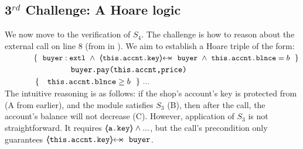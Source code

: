   
  \subsection{3$^{rd}$ Challenge:  A Hoare logic} %
 \label{sec:howThird}


 
 \vspace{.1cm}
 
We now move to the  verification of $S_4$. 
The challenge is how to reason  about the external call on line 8 (from  in ). %
% 
%
% 
We aim to establish a Hoare triple of the form:
 \\
$\strut \ \ \ \ \ \ \ \ \ \ \  \{\  \ { \external{\prg{buyer}}} \ \wedge\ {\protectedFrom {\prg{this.\myAccount.key}} {\prg{buyer}}\ \wedge\ {\prg{this.\myAccount.\balance}}= b    }\ \  \}$\\
$\strut \ \ \ \ \ \ \ \ \ \ \   \ \ \ \ \ \ \ \ \ \ \ \ {\ \prg{buyer.pay(this.accnt,price)}   \ } $\\
$\strut \ \ \ \ \ \ \ \ \ \ \  \{\  \ \  {\prg{this.\myAccount.\balance}} \geq  b \  \  \}\ \sdred{...}$ 
\\
The intuitive reasoning is as follows: if the shop's account's key is protected from  (A from earlier), and the module satisfies $S_3$ (B), then after the call, the account's balance will not decrease (C).
%
However, application of $S_3$ is not straightforward. 
It requires ${\langle\!\!\langle \mbox{\normalfont{\texttt{a.key}}} \rangle\!\!\rangle} \wedge ...$,  but  the call's precondition only guarantees $\protectedFrom{\prg{this.\myAccount.key}}{\prg{buyer}}$. 


